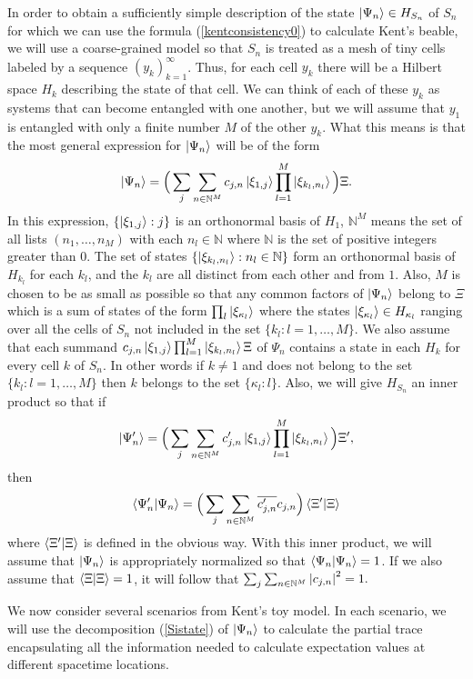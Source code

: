 In order to obtain a sufficiently simple description of the state $\ket{\Psi_n}\in H_{S_n}$ of $S_n$ for which we can use the formula (\ref{kentconsistency0}) to calculate Kent's beable, we will  
use a coarse-grained model so that $S_n$ is treated as a mesh of tiny cells labeled by a sequence $(y_k)_{k=1}^\infty$. Thus, for each cell $y_k$ there will be a Hilbert space $H_k$ describing the state of that cell. We can think of each of these $y_k$ as systems that can become entangled with one another, but we will assume that $y_1$ is entangled with only a finite number $M$ of the other $y_k$. What this means is that the most general expression for $\ket{\Psi_n}$ will be of the form
\begin{equation}\label{Sistate}
\ket{\Psi_n}=\Big(\sum_j\sum_{n\in\mathbb{N}^M} c_{j,n}\ket{\xi_{1,j}}\prod_{l=1}^{M}\ket{\xi_{k_{l},n_l}}\Big)\Xi.
\end{equation}
In this expression, $\{\ket{\xi_{1,j}}:j\}$ is an orthonormal basis of $H_1$, $\mathbb{N}^M$ means the set of all lists $(n_1,\ldots,n_M)$ with each $n_l\in\mathbb{N}$ where $\mathbb{N}$ is the set of positive integers greater than 0. The set of states $\{\ket{\xi_{k_{l},n_l}}:n_l\in\mathbb{N}\}$ form an orthonormal basis of $H_{k_{l}}$ for each $k_l$, and the $k_{l}$ are all distinct from each other and from $1$. Also, $M$ is chosen to be as small as possible so that any common factors of $\ket{\Psi_n}$ belong to $\Xi$ which is a sum of states of the form $\prod_l\ket{\xi_{\kappa_l}}$ where the states $\ket{\xi_{\kappa_l}}\in H_{\kappa_l}$ ranging over all the cells of $S_n$ not included in the set $\{k_{l}:l=1,\ldots,M\}.$ We also assume that each summand $c_{j,n}\ket{\xi_{1,j}}\prod_{l=1}^{M}\ket{\xi_{k_{l},n_l}}\Xi$ of $\Psi_n$ contains a state in each $H_k$ for every cell $k$ of $S_n$. In other words if $k\neq 1$ and does not belong to the set $\{k_{l}:l=1,\ldots,M\}$ then $k$ belongs to the set $\{\kappa_l:l\}$. Also, we will give $H_{S_n}$ an inner product so that if 
$$ \ket{\Psi_n'}=\Big(\sum_j\sum_{n\in\mathbb{N}^M} c'_{j,n}\ket{\xi_{1,j}}\prod_{l=1}^{M}\ket{\xi_{k_{l},n_l}}\Big)\Xi',$$ then
$$\ip{\Psi_n'}{\Psi_n}=\Big(\sum_j\sum_{n\in\mathbb{N}^M} \overline{c'_{j,n}}c_{j,n} \Big) \ip{\Xi'}{\Xi}$$
where $\ip{\Xi'}{\Xi}$ is defined in the obvious way. With this inner product, we will assume that $\ket{\Psi_n}$ is appropriately normalized so that $\ip{\Psi_n}{\Psi_n}=1$. If we also assume that  $\ip{\Xi}{\Xi}=1$, it will follow that $\sum_j\sum_{n\in\mathbb{N}^M}\abs{c_{j,n}}^2=1.$

We now consider several scenarios from Kent's toy model. In each scenario, we will use the decomposition (\ref{Sistate}) of $\ket{\Psi_n}$ to calculate the partial trace encapsulating all the information needed to calculate expectation values at different spacetime locations. 

